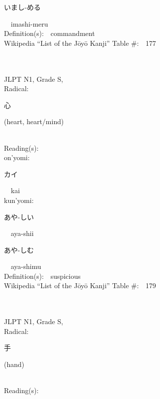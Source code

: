 \begin{multicols}{2}
{\hspace*{2em}}{\begin{CJK}{UTF8}{min} いまし-める \end{CJK}}\ \ imashi-meru\ \ \\
Definition(s):\ \ commandment \\
Wikipedia ``List of the J\=oy\=o Kanji'' Table \#:\ \ 177 \\
\ \ \\
{\fontsize{34pt}{40pt}  }\ \ \\
{JLPT N1, Grade S, \\Radical:\ \ {\begin{CJK}{UTF8}{min} 心 \end{CJK}} (heart, heart/mind) } \\
Reading(s):\ \ \\
{\hspace*{1em}}on'yomi:\ \ \\
{\hspace*{2em}}{\begin{CJK}{UTF8}{min} カイ \end{CJK}}\ \ kai\ \ \\
{\hspace*{1em}}kun'yomi:\ \ \\
{\hspace*{2em}}{\begin{CJK}{UTF8}{min} あや-しい \end{CJK}}\ \ aya-shii\ \ \\
{\hspace*{2em}}{\begin{CJK}{UTF8}{min} あや-しむ \end{CJK}}\ \ aya-shimu\ \ \\
Definition(s):\ \ suspicious \\
Wikipedia ``List of the J\=oy\=o Kanji'' Table \#:\ \ 179 \\
\ \ \\
{\fontsize{34pt}{40pt}  }\ \ \\
{JLPT N1, Grade S, \\Radical:\ \ {\begin{CJK}{UTF8}{min} 手 \end{CJK}} (hand) } \\
Reading(s):\ \ \\

\end{multicols}
